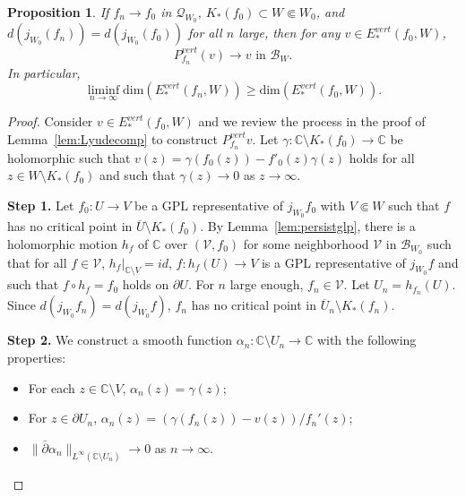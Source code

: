 \documentclass{amsart}
\numberwithin{equation}{section}
\newtheorem{proposition}[theorem]{Proposition}%
\newcommand{\C}{\mathbb C}
\theoremstyle{definition}
\theoremstyle{remark}
\begin{document}
\begin{proposition}\label{prop:upperbd}  If $f_n\to f_0$ in $\mathcal{Q}_{W_0}$, $K_*(f_0)\subset W\Subset W_0$, and $d(j_{W_0} (f_n))=d(j_{W_0} (f_0))$ for all $n$ large, then  for any $v\in E^{vert}_*(f_0, W)$, $$P_{f_n}^{vert}(v)\to v \text{ in }\mathcal{B}_{W}.$$
In particular,
$$\liminf_{n\to\infty} \text{dim}(E^{vert}_*(f_n,W))\ge \text{dim}(E^{vert}_*(f_0,W)).$$
\end{proposition}
\begin{proof} Consider $v\in E^{vert}_*(f_0,W)$ and we review the process in the proof of Lemma~\ref{lem:Lyudecomp} to construct $P^{vert}_{f_n}v$.  Let
$\gamma:\mathbb{C} \setminus K_*(f_0)\to \mathbb{C}$ be holomorphic such that $v(z)=\gamma(f_0(z))- f'_0(z)\gamma(z)$ holds for all $z\in W\setminus K_*(f_0)$ and such that $\gamma(z)\to 0$ 
as $z\to\infty$.

{\bf Step 1.} Let $f_0: U\to V$ be a GPL representative of $j_{W_0}f_0$ with $V\Subset W$ such that $f$ has no critical point in $\overline{U}\setminus K_*(f_0)$. By Lemma~\ref{lem:persistglp}, there is a holomorphic motion $h_f$ of $\C$ over $(\mathcal{V},f_0)$ for some neighborhood $\mathcal{V}$ in $\mathcal{B}_{W_0}$ such that for all $f\in \mathcal{V}$, $h_f|_{\C\setminus V}=id$, $f:h_f(U)\to V$ is a GPL representative of $j_{W_0}f$ and such that $f\circ h_f=f_0$ holds on $\partial U$. For $n$ large enough, $f_n\in \mathcal{V}$. Let $U_n=h_{f_n}(U)$. Since $d(j_{W_0} f_n)=d(j_{W_0} f)$, $f_n$ has no critical point in $\overline{U}_n\setminus K_*(f_n)$.


{\bf Step 2.} We construct a smooth function $\alpha_n: \mathbb{C}\setminus U_n\to \mathbb{C}$ with the following properties:
\begin{itemize}
\item For each $z\in \mathbb{C}\setminus V$, $\alpha_n(z)=\gamma(z)$; 
\item For $z\in \partial U_n$, $\alpha_n(z)=(\gamma(f_n(z))-v(z))/f_n'(z)$;
\item $\|\bar{\partial} \alpha_n\|_{L^\infty(\C\setminus U_n)}\to 0$ as $n\to\infty$.
\end{itemize}






\end{proof}
\end{document}

